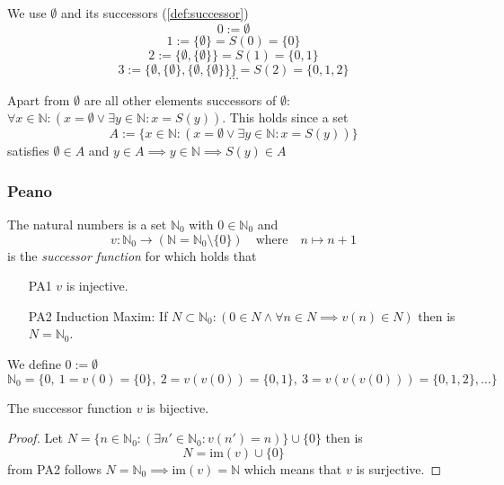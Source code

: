 \begin{definition}\label{def:n}
   We use \(\emptyset\) and its successors (\ref{def:successor})
   \[0 := \emptyset\]
   \[1 := \{\emptyset\} = S(0) = \{0\}\]
   \[2 := \{\emptyset, \{\emptyset\}\} = S(1) = \{0, 1\}\]
   \[3 := \{\emptyset, \{\emptyset\},\{\emptyset, \{\emptyset\}\}\} = S(2) = \{0, 1, 2\}\]
   \[\ldots\]
\end{definition}
\begin{remark}
   Apart from \(\emptyset\) are all other elements successors of \(\emptyset\): \(\forall x \in \mathbb{N}: (x = \emptyset \lor \exists y \in \mathbb{N}: x = S(y))\). This holds since a set
   \[A := \{x \in \mathbb{N}: (x = \emptyset \lor \exists y \in \mathbb{N}: x = S(y))\}\]
   satisfies \(\emptyset \in A\) and \(y \in A \implies y \in \mathbb{N} \implies S(y) \in A\)
\end{remark}

\subsubsection{Peano}
\begin{definition}\label{def:peano_axioms}
   The natural numbers is a set \(\mathbb{N}_0\) with \(0 \in \mathbb{N}_0\) and
   \[v: \mathbb{N}_0 \to (\mathbb{N} = \mathbb{N}_0 \setminus \{0\}) \quad\text{where}\quad n \mapsto n + 1\]
   is the \textit{successor function} for which holds that
   \begin{enumerate}[leftmargin=0.85cm]
      \item [PA1] \(v\) is injective.
      \item [PA2] Induction Maxim: If \(N \subset \mathbb{N}_0: (0 \in N \land \forall n \in N \implies v(n) \in N)\) then is \(N = \mathbb{N}_0\).
   \end{enumerate}
\end{definition}
\begin{example}
   We define \(0 := \emptyset\)
   \[\mathbb{N}_0 = \big\{0,~1 = v(0) = \{0\},~2 = v(v(0)) = \{0, 1\},~3 = v(v(v(0))) = \{0, 1, 2\}, \ldots\big\}\]
\end{example}

\begin{proposition}[\(v\) bijective]\label{pro:v_bijective}
   The successor function \(v\) is bijective.
\end{proposition}
\begin{proof}
   Let \(N = \{n \in \mathbb{N}_0: (\exists n' \in \mathbb{N}_0: v(n') = n)\} \cup \{0\}\) then is
   \[N = \text{im}(v) \cup \{0\}\]
   from PA2 follows \(N = \mathbb{N}_0 \implies \text{im}(v) = \mathbb{N}\) which means that \(v\) is surjective.
\end{proof}

